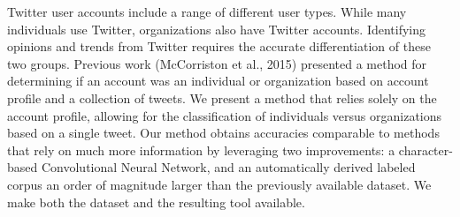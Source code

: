 Twitter user accounts include a range of different user types. While many individuals use Twitter, organizations also have Twitter accounts. Identifying opinions and trends from Twitter requires the accurate differentiation of these two groups. Previous work (McCorriston et al., 2015) presented a method for determining if an account was an individual or organization based on account profile and a collection of tweets. We present a method that relies solely on the account profile, allowing for the classification of individuals versus organizations based on a single tweet. Our method obtains accuracies comparable to methods that rely on much more information by leveraging two improvements: a character-based Convolutional Neural Network, and an automatically derived labeled corpus an order of magnitude larger than the previously available dataset. We make both the dataset and the resulting tool available.
